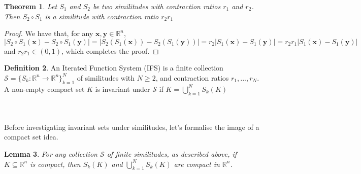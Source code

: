 \documentclass{article}
\theoremstyle{plain}
\newtheorem{thm}{Theorem}[section]
\newtheorem{lem}[thm]{Lemma}
\theoremstyle{definition}
\newtheorem{defn}[thm]{Definition}
\theoremstyle{remark}
\begin{document}
\begin{thm} \label{thm:compose}
Let $S_1$ and $S_2$ be two similitudes with contraction ratios $r_1$ and $r_2$. Then $S_2 \circ S_1$ is a similitude with contraction ratio $r_2r_1$
\end{thm}

\begin{proof}
We have that, for any $\mathbf{x},\mathbf{y} \in \mathbb{R}^n$, \[
|S_2 \circ S_1 (\mathbf{x}) - S_2 \circ S_1 (\mathbf{y})| = |S_2 (S_1 (\mathbf{x})) - S_2 (S_1 (\mathbf{y}))| = r_2 |S_1 (\mathbf{x}) - S_1 (\mathbf{y})| = r_2 r_1 |S_1 (\mathbf{x}) - S_1 (\mathbf{y}) |
\]
and $r_2r_1 \in (0,1)$, which completes the proof.
\end{proof}

\begin{defn}
    An Iterated Function System (IFS) is a finite collection $\mathcal{S}=\{S_k:\mathbb{R}^n \to \mathbb{R}^n\}_{k=1}^N$ of similitudes with $N\ge 2$, and contraction ratios $r_1, ..., r_N$. A non-empty compact set $K$ is invariant under $\mathcal{S}$ if $K = \bigcup \limits _{k=1}^N S_k(K)$
\end{defn}
~\\
\noindent{}
~\\
Before investigating invariant sets under similitudes, let's formalise the image of a compact set idea.
\begin{lem}
    For any collection $\mathcal{S}$ of finite similitudes, as described above, if $K \subseteq \mathbb{R}^n$ is compact, then $S_k(K)$ and $\bigcup \limits _{k=1}^N S_k(K)$ are compact in $\mathbb{R}^n$.
\end{lem}
\end{document}
